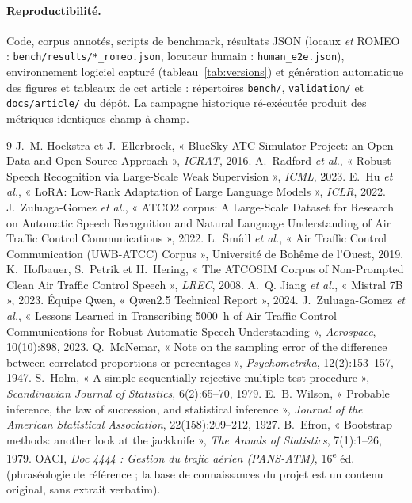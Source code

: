 \documentclass[10pt,a4paper]{article}
\newcommand{\syst}[1]{\texttt{#1}}
\begin{document}
\paragraph{Reproductibilité.} Code, corpus annotés, scripts de benchmark,
résultats JSON (locaux \emph{et} ROMEO : \syst{bench/results/*\_romeo.json},
locuteur humain : \syst{human\_e2e.json}), environnement logiciel capturé
(tableau~\ref{tab:versions}) et génération automatique des figures et
tableaux de cet article : répertoires \syst{bench/}, \syst{validation/} et
\syst{docs/article/} du dépôt. La campagne historique ré-exécutée produit
des métriques identiques champ à champ.

\begin{thebibliography}{9}\small
{} J.~M. Hoekstra et J.~Ellerbroek,
« BlueSky ATC Simulator Project: an Open Data and Open Source Approach »,
\emph{ICRAT}, 2016.
 A.~Radford \emph{et al.},
« Robust Speech Recognition via Large-Scale Weak Supervision »,
\emph{ICML}, 2023.
 E.~Hu \emph{et al.}, « LoRA: Low-Rank Adaptation of Large
Language Models », \emph{ICLR}, 2022.
 J.~Zuluaga-Gomez \emph{et al.}, « ATCO2 corpus: A Large-Scale
Dataset for Research on Automatic Speech Recognition and Natural Language
Understanding of Air Traffic Control Communications », 2022.
 L.~Šmídl \emph{et al.}, « Air Traffic Control Communication
(UWB-ATCC) Corpus », Université de Bohême de l'Ouest, 2019.
 K.~Hofbauer, S.~Petrik et H.~Hering, « The ATCOSIM Corpus of
Non-Prompted Clean Air Traffic Control Speech », \emph{LREC}, 2008.
 A.~Q. Jiang \emph{et al.}, « Mistral 7B », 2023.
 Équipe Qwen, « Qwen2.5 Technical Report », 2024.
 J.~Zuluaga-Gomez \emph{et al.}, « Lessons Learned in
Transcribing 5000~h of Air Traffic Control Communications for Robust
Automatic Speech Understanding », \emph{Aerospace}, 10(10):898, 2023.
 Q.~McNemar, « Note on the sampling error of the difference
between correlated proportions or percentages », \emph{Psychometrika},
12(2):153--157, 1947.
 S.~Holm, « A simple sequentially rejective multiple test
procedure », \emph{Scandinavian Journal of Statistics}, 6(2):65--70, 1979.
 E.~B. Wilson, « Probable inference, the law of succession,
and statistical inference », \emph{Journal of the American Statistical
Association}, 22(158):209--212, 1927.
 B.~Efron, « Bootstrap methods: another look at the
jackknife », \emph{The Annals of Statistics}, 7(1):1--26, 1979.
 OACI, \emph{Doc 4444 : Gestion du trafic aérien (PANS-ATM)},
16\textsuperscript{e} éd. (phraséologie de référence ; la base de
connaissances du projet est un contenu original, sans extrait verbatim).
\end{thebibliography}
\end{document}
